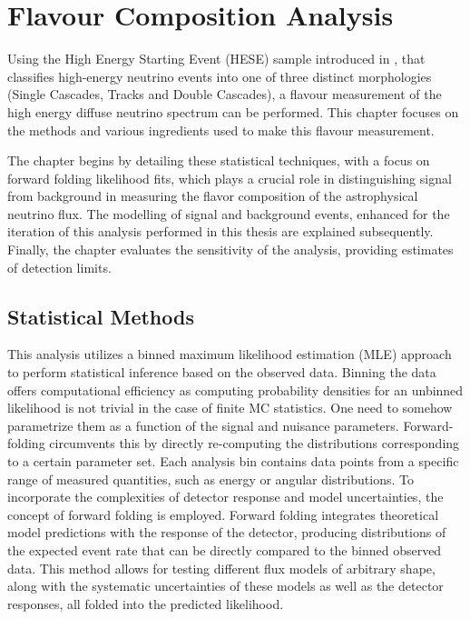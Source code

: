 \setchapterpreamble[u]{\margintoc}
\chapter{Flavour Composition Analysis}
Using the High Energy Starting Event (HESE) sample introduced in , that classifies high-energy neutrino events into one of three distinct morphologies (Single Cascades, Tracks and Double Cascades), a flavour measurement of the high energy diffuse neutrino spectrum can be performed. This chapter focuses on the methods and various ingredients used to make this flavour measurement. 

The chapter begins by detailing these statistical techniques, with a focus on forward folding likelihood fits, which plays a crucial role in distinguishing signal from background in measuring the flavor composition of the astrophysical neutrino flux. The modelling of signal and background events, enhanced for the iteration of this analysis performed in this thesis are explained subsequently. Finally, the chapter evaluates the sensitivity of the analysis, providing estimates of detection limits.
\section{Statistical Methods}
\label{sec:analysis}
This analysis utilizes a binned maximum likelihood estimation (MLE) approach to perform statistical inference based on the observed data. Binning the data offers computational efficiency as computing probability densities for an unbinned likelihood is not trivial in the case of finite MC statistics. One need to somehow parametrize them as a function of the signal and nuisance parameters. Forward-folding circumvents this by directly re-computing the distributions corresponding to a certain parameter set. Each analysis bin contains data points from a specific range of measured quantities, such as energy or angular distributions. To incorporate the complexities of detector response and model uncertainties, the concept of forward folding is employed. Forward folding integrates theoretical model predictions with the response of the detector, producing distributions of the expected event rate that can be directly compared to the binned observed data. This method allows for testing different flux models of arbitrary shape, along with the systematic uncertainties of these models as well as the detector responses, all folded into the predicted likelihood. 

